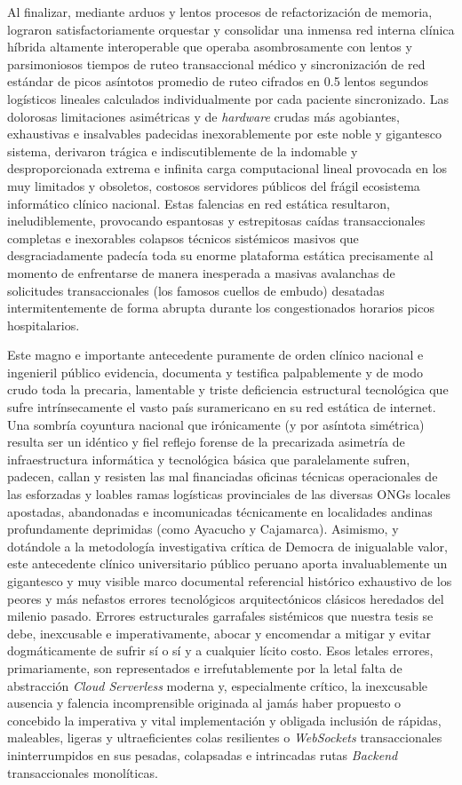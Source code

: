 Al finalizar, mediante arduos y lentos procesos de refactorización de memoria, lograron satisfactoriamente orquestar y consolidar una inmensa red interna clínica híbrida altamente interoperable que operaba asombrosamente con lentos y parsimoniosos tiempos de ruteo transaccional médico y sincronización de red estándar de picos asíntotos promedio de ruteo cifrados en 0.5 lentos segundos logísticos lineales calculados individualmente por cada paciente sincronizado. Las dolorosas limitaciones asimétricas y de \textit{hardware} crudas más agobiantes, exhaustivas e insalvables padecidas inexorablemente por este noble y gigantesco sistema, derivaron trágica e indiscutiblemente de la indomable y desproporcionada extrema e infinita carga computacional lineal provocada en los muy limitados y obsoletos, costosos servidores públicos del frágil ecosistema informático clínico nacional. Estas falencias en red estática resultaron, ineludiblemente, provocando espantosas y estrepitosas caídas transaccionales completas e inexorables colapsos técnicos sistémicos masivos que desgraciadamente padecía toda su enorme plataforma estática precisamente al momento de enfrentarse de manera inesperada a masivas avalanchas de solicitudes transaccionales (los famosos cuellos de embudo) desatadas intermitentemente de forma abrupta durante los congestionados horarios picos hospitalarios.

Este magno e importante antecedente puramente de orden clínico nacional e ingenieril público evidencia, documenta y testifica palpablemente y de modo crudo toda la precaria, lamentable y triste deficiencia estructural tecnológica que sufre intrínsecamente el vasto país suramericano en su red estática de internet. Una sombría coyuntura nacional que irónicamente (y por asíntota simétrica) resulta ser un idéntico y fiel reflejo forense de la precarizada asimetría de infraestructura informática y tecnológica básica que paralelamente sufren, padecen, callan y resisten las mal financiadas oficinas técnicas operacionales de las esforzadas y loables ramas logísticas provinciales de las diversas ONGs locales apostadas, abandonadas e incomunicadas técnicamente en localidades andinas profundamente deprimidas (como Ayacucho y Cajamarca). Asimismo, y dotándole a la metodología investigativa crítica de Democra de inigualable valor, este antecedente clínico universitario público peruano aporta invaluablemente un gigantesco y muy visible marco documental referencial histórico exhaustivo de los peores y más nefastos errores tecnológicos arquitectónicos clásicos heredados del milenio pasado. Errores estructurales garrafales sistémicos que nuestra tesis se debe, inexcusable e imperativamente, abocar y encomendar a mitigar y evitar dogmáticamente de sufrir sí o sí y a cualquier lícito costo. Esos letales errores, primariamente, son representados e irrefutablemente por la letal falta de abstracción \textit{Cloud Serverless} moderna y, especialmente crítico, la inexcusable ausencia y falencia incomprensible originada al jamás haber propuesto o concebido la imperativa y vital implementación y obligada inclusión de rápidas, maleables, ligeras y ultraeficientes colas resilientes o \textit{WebSockets} transaccionales ininterrumpidos en sus pesadas, colapsadas e intrincadas rutas \textit{Backend} transaccionales monolíticas.

